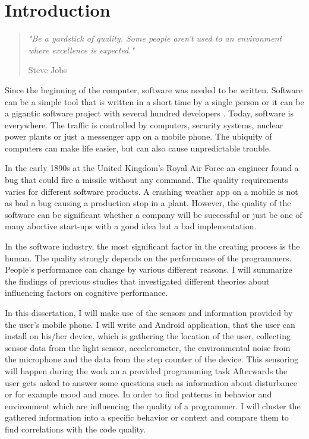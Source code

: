 \chapter{Introduction}

\begin{quote}
\centering 
\em %
"Be a yardstick of quality. Some people aren't used to an environment where excellence is expected."

\medskip
\raggedleft
Steve Jobs
\end{quote}
\vspace*{\fill}

\begin{flushleft}
Since the beginning of the computer, software was needed to be written. Software can be a simple tool that is written in a short time by a single person or it can be a gigantic software project with several hundred developers \cite{cusumano1997microsoft}.
Today, software is everywhere. The traffic is controlled by computers, security systems, nuclear power plants or just a messenger app on a mobile phone. 
The ubiquity of computers can make life easier, but can also cause unpredictable trouble.

In the early 1890s at the United Kingdom's Royal Air Force an engineer found a bug that could fire a missile without any command. \cite{ross2005exterminators}
The quality requirements varies for different software products. A crashing weather app on a mobile is not as bad a bug causing a production stop in a plant. 
However, the quality of the software can be significant whether a company will be successful or just be one of many abortive start-ups with a good idea but a bad implementation. 

In the software industry, the most significant factor in the creating process is the human. The quality strongly depends on the performance of the programmers. 
People's performance can change by various different reasons. I will summarize the findings of previous studies that investigated different theories about influencing factors on cognitive performance. 

In this dissertation, I will make use of the sensors and information provided by the user's mobile phone. I will write and Android application, that the user can install on his/her device, which is gathering the location of the user, collecting sensor data from the light sensor, accelerometer, the environmental noise from the microphone and the data from the step counter of the device.
This sensoring will happen during the work an a provided programming task Afterwards the user gets asked to answer some questions such as information about disturbance or for example mood and more. 
In order to find patterns in behavior and environment which are influencing the quality of a programmer. I will cluster the gathered information into a specific behavior or context and compare them to find correlations with the code quality. 


\end{flushleft}
